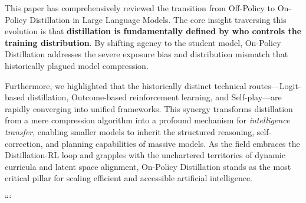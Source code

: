 This paper has comprehensively reviewed the transition from Off-Policy to On-Policy Distillation in Large Language Models. The core insight traversing this evolution is that \textbf{distillation is fundamentally defined by who controls the training distribution}. By shifting agency to the student model, On-Policy Distillation addresses the severe exposure bias and distribution mismatch that historically plagued model compression.

Furthermore, we highlighted that the historically distinct technical routes—Logit-based distillation, Outcome-based reinforcement learning, and Self-play—are rapidly converging into unified frameworks. This synergy transforms distillation from a mere compression algorithm into a profound mechanism for \textit{intelligence transfer}, enabling smaller models to inherit the structured reasoning, self-correction, and planning capabilities of massive models. As the field embraces the Distillation-RL loop and grapples with the unchartered territories of dynamic curricula and latent space alignment, On-Policy Distillation stands as the most critical pillar for scaling efficient and accessible artificial intelligence.




```

